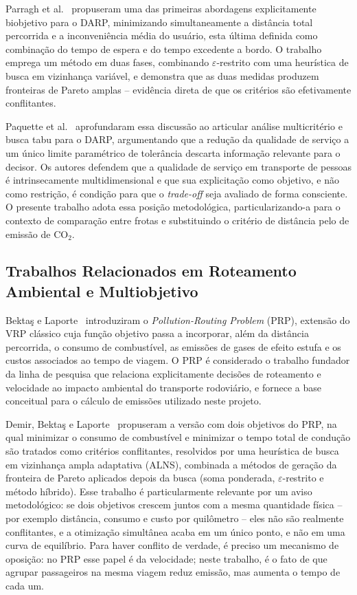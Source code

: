 \documentclass[12pt,a4paper]{article}
\theoremstyle{plain}
\begin{document}
Parragh et al.~\cite{parragh2009} propuseram uma das primeiras abordagens explicitamente biobjetivo para o DARP, minimizando simultaneamente a distância total percorrida e a inconveniência média do usuário, esta última definida como combinação do tempo de espera e do tempo excedente a bordo. O trabalho emprega um método em duas fases, combinando $\varepsilon$-restrito com uma heurística de busca em vizinhança variável, e demonstra que as duas medidas produzem fronteiras de Pareto amplas -- evidência direta de que os critérios são efetivamente conflitantes.

Paquette et al.~\cite{paquette2013} aprofundaram essa discussão ao articular análise multicritério e busca tabu para o DARP, argumentando que a redução da qualidade de serviço a um único limite paramétrico de tolerância descarta informação relevante para o decisor. Os autores defendem que a qualidade de serviço em transporte de pessoas é intrinsecamente multidimensional e que sua explicitação como objetivo, e não como restrição, é condição para que o \textit{trade-off} seja avaliado de forma consciente. O presente trabalho adota essa posição metodológica, particularizando-a para o contexto de comparação entre frotas e substituindo o critério de distância pelo de emissão de $\text{CO}_2$.

\subsection{Trabalhos Relacionados em Roteamento Ambiental e Multiobjetivo}

Bektaş e Laporte~\cite{bektas2011} introduziram o \textit{Pollution-Routing Problem} (PRP), extensão do VRP clássico cuja função objetivo passa a incorporar, além da distância percorrida, o consumo de combustível, as emissões de gases de efeito estufa e os custos associados ao tempo de viagem. O PRP é considerado o trabalho fundador da linha de pesquisa que relaciona explicitamente decisões de roteamento e velocidade ao impacto ambiental do transporte rodoviário, e fornece a base conceitual para o cálculo de emissões utilizado neste projeto.

Demir, Bektaş e Laporte~\cite{demir2014} propuseram a versão com dois objetivos do PRP, na qual minimizar o consumo de combustível e minimizar o tempo total de condução são tratados como critérios conflitantes, resolvidos por uma heurística de busca em vizinhança ampla adaptativa (ALNS), combinada a métodos de geração da fronteira de Pareto aplicados depois da busca (soma ponderada, $\varepsilon$-restrito e método híbrido). Esse trabalho é particularmente relevante por um aviso metodológico: se dois objetivos crescem juntos com a mesma quantidade física -- por exemplo distância, consumo e custo por quilômetro -- eles não são realmente conflitantes, e a otimização simultânea acaba em um único ponto, e não em uma curva de equilíbrio. Para haver conflito de verdade, é preciso um mecanismo de oposição: no PRP esse papel é da velocidade; neste trabalho, é o fato de que agrupar passageiros na mesma viagem reduz emissão, mas aumenta o tempo de cada um.
\end{document}
